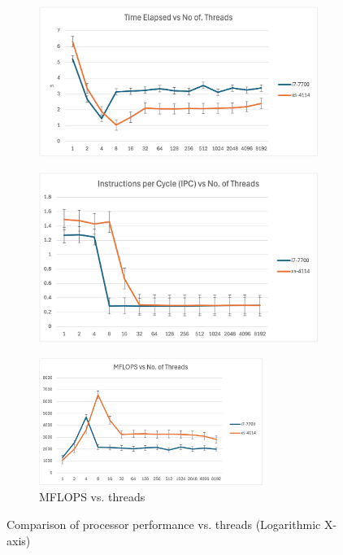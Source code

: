 \documentclass{article}
\begin{document}
\begin{figure}[H]
	\centering
	\begin{subfigure}{0.5\textwidth}
		\centering
		\includegraphics[width=0.8\linewidth]{timeElapsed.png}
		\label{fig:timeGraph}
	\end{subfigure}%
	\begin{subfigure}{0.5\textwidth}
		\centering
		\includegraphics[width=0.8\linewidth]{ipc.png}
		\label{fig:ipcGraph}
	\end{subfigure}%
	\newline
	\begin{subfigure}{0.5\textwidth}
		\centering
		\includegraphics[width=0.8\textwidth]{mflops.png}
		\caption{MFLOPS vs. threads}
		\label{fig:mflopsGraph}
	\end{subfigure}
	\caption{Comparison of processor performance vs. threads (Logarithmic X-axis)}
	\label{fig:graphsColWise}
\end{figure}
\end{document}
